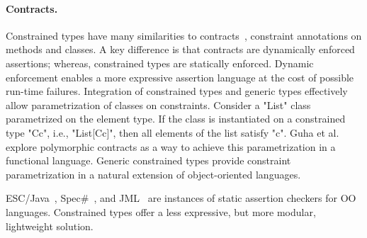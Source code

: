 \paragraph{Contracts.}

Constrained types have many similarities to
contracts~\cite{Parnas72,eiffel,Findler02},
constraint annotations on methods and classes.
A key difference is that contracts are dynamically enforced
assertions; whereas, constrained types are statically enforced.
Dynamic enforcement enables a more expressive assertion language
at the cost of possible run-time failures.
Integration of constrained types and generic types
effectively allow parametrization of classes on constraints.
Consider a \xcd"List" class parametrized on the element type.
If the class is instantiated on a constrained type \xcd"C{c}",
i.e., \xcd"List[C{c}]",
then all elements of the list satisfy \xcd"c".
Guha et al.~\cite{GMFK07} 
explore polymorphic contracts as a way to achieve this
parametrization in a functional language.
Generic constrained types provide constraint parametrization
in a natural extension of object-oriented languages.

ESC/Java~\cite{escjava-pldi02}, Spec\#~\cite{specsharp}, and
JML~\cite{leavens00jml} are instances of
static assertion checkers for OO languages.  Constrained types
offer a less expressive, but more modular, lightweight solution.

